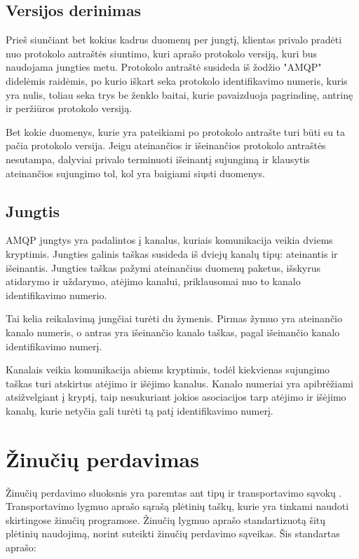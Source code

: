 \documentclass[12pt, a4paper, lithuanian]{article}
\begin{document}
    \subsection{Versijos derinimas}

    Prieš siunčiant bet kokius kadrus duomenų per jungtį, klientas privalo pradėti nuo protokolo antraštės siuntimo, kuri aprašo protokolo versiją, kuri bus naudojama jungties metu.
    Protokolo antraštė susideda iš žodžio "AMQP" didelėmis raidėmis, po kurio iškart seka protokolo identifikavimo numeris, kuris yra nulis, toliau seka trys be ženklo baitai, kurie pavaizduoja pagrindinę, antrinę ir peržiūros protokolo versiją.

    Bet kokie duomenys, kurie yra pateikiami po protokolo antrašte turi būti su ta pačia protokolo versija.
    Jeigu ateinančios ir išeinančios protokolo antraštės nesutampa, dalyviai privalo terminuoti išeinantį sujungimą ir klausytis ateinančios sujungimo tol, kol yra baigiami siųsti duomenys.

    \subsection{Jungtis}

    AMQP jungtys yra padalintos į kanalus, kuriais komunikacija veikia dviems kryptimis.
    Jungties galinis taškas susideda iš dviejų kanalų tipų: ateinantis ir išeinantis.
    Jungties taškas pažymi ateinančius duomenų paketus, išskyrus atidarymo ir uždarymo, atėjimo kanalui, priklausomai nuo to kanalo identifikavimo numerio.

    Tai kelia reikalavimą jungčiai turėti du žymenis.
    Pirmas žymuo yra ateinančio kanalo numeris, o antras yra išeinančio kanalo taškas, pagal išeinančio kanalo identifikavimo numerį.

    Kanalais veikia komunikacija abiems kryptimis, todėl kiekvienas sujungimo taškas turi atskirtus atėjimo ir išėjimo kanalus.
    Kanalo numeriai yra apibrėžiami atsižvelgiant į kryptį, taip nesukuriant jokios asociacijos tarp atėjimo ir išėjimo kanalų, kurie netyčia gali turėti tą patį identifikavimo numerį.

    \section{Žinučių perdavimas}

    Žinučių perdavimo sluoksnis yra paremtas ant tipų ir transportavimo sąvokų \cite{OASISAdv71:online}.
    Transportavimo lygmuo aprašo sąrašą plėtinių taškų, kurie yra tinkami naudoti skirtingose žinučių programose.
    Žinučių lygmuo aprašo standartizuotą šitų plėtinių naudojimą, norint suteikti žinučių perdavimo sąveikas.
    Šis standartas aprašo:
\end{document}
